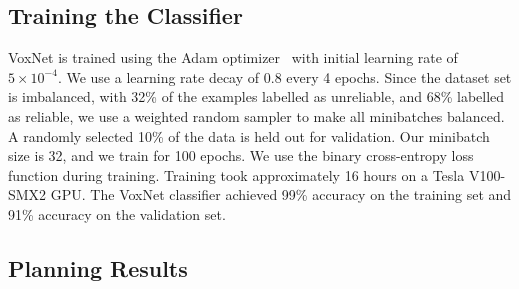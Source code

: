 \subsection{Training the Classifier}
VoxNet is trained using the Adam optimizer~\cite{adamOptimizer2015} with initial learning rate of $5 \times 10^{-4}$. We use a learning rate decay of $0.8$ every 4 epochs. Since the dataset set is imbalanced, with 32\% of the examples labelled as unreliable, and 68\% labelled as reliable, we use a weighted random sampler to make all minibatches balanced. A randomly selected 10\% of the data is held out for validation. Our minibatch size is 32, and we train for 100 epochs. We use the binary cross-entropy loss function during training. Training took approximately 16 hours on a Tesla V100-SMX2 GPU. The VoxNet classifier achieved 99\% accuracy on the training set and 91\% accuracy on the validation set. 



\subsection{Planning Results}

